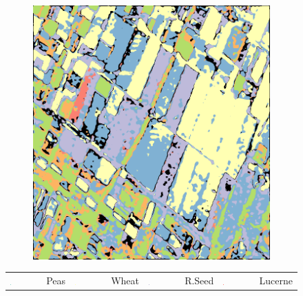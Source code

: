 \begin{figure}[t]
\begin{subfigure}[b]{0.24\textwidth}
        \caption{}
        \label{fig:L}
    \end{subfigure}
    \begin{subfigure}[b]{0.24\textwidth}
        \includegraphics[width=\textwidth]{Figures/Kron/P_COLOUR}
        \caption{}
        \label{fig:P}
    \end{subfigure}
\begin{tabular}{llllllll}
\includegraphics[width=0.01\textwidth]{Figures/Kron/Legend/Pea} & Peas & \includegraphics[width=0.01\textwidth]{Figures/Kron/Legend/Wheat} & Wheat & \includegraphics[width=0.01\textwidth]{Figures/Kron/Legend/Rseed} & R.Seed & \includegraphics[width=0.01\textwidth]{Figures/Kron/Legend/Luc} & Lucerne  \\

\end{tabular}
\end{figure}
